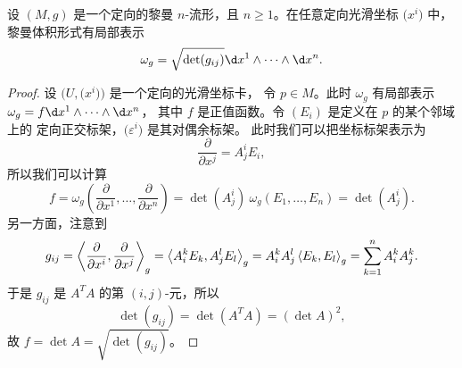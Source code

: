 \begin{proposition}
  设 $(M,g)$ 是一个定向的黎曼 $n$-流形，且 $n\geq 1$。在任意定向光滑坐标 
  $\bigl(x^i\bigr)$ 中，黎曼体积形式有局部表示
  \[
    \omega_g=\sqrt{\det(g_{ij})}\d x^1\wedge\cdots\wedge \d x^n.
  \]
\end{proposition}
\begin{proof}
  设 $\bigl(U,\bigl(x^i\bigr)\bigr)$ 是一个定向的光滑坐标卡，
  令 $p\in M$。此时 $\omega_g$ 有局部表示 $\omega_g=f\d x^1\wedge\cdots\wedge \d x^n$，
  其中 $f$ 是正值函数。令 $(E_i)$ 是定义在 $p$ 的某个邻域上的
  定向正交标架，$\bigl(\varepsilon^i\bigr)$ 是其对偶余标架。
  此时我们可以把坐标标架表示为
  \[
    \frac{\partial}{\partial x^j}=A^i_jE_i ,
  \]
  所以我们可以计算
  \begin{equation*}
    f=\omega_g\left( \frac{\partial}{\partial x^1},\dots, \frac{\partial}{\partial x^n}\right)
    =\det(A^i_j)\ \omega_g(E_1,\dots,E_n)=\det(A_j^i).
  \end{equation*}
  另一方面，注意到
  \[
    g_{ij}=\left\langle \frac{\partial}{\partial x^i},\frac{\partial}{\partial x^j}\right\rangle_g =
    \left\langle A^k_iE_k,A^l_jE_l\right\rangle_g=A_i^kA_j^l\left\langle E_k,E_l\right\rangle_g
    =\sum_{k=1}^n A_i^kA_j^k.
  \]
  于是 $g_{ij}$ 是 $A^TA$ 的第 $(i,j)$-元，所以
  \[
    \det(g_{ij})=\det(A^TA)=(\det A)^2,
  \]
  故 $f=\det A=\sqrt{\det(g_{ij})}$。
\end{proof}






